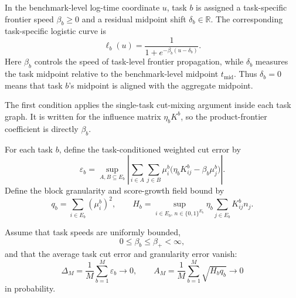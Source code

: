 \begin{definition}
\label{def:task-specific-logistic-frontier}
In the benchmark-level log-time coordinate \(u\), task \(b\) is assigned a task-specific frontier speed \(\beta_b\ge0\) and a residual midpoint shift \(\delta_b\in\mathbb R\). The corresponding task-specific logistic curve is
\begin{equation}
    \ell_b(u)=
    \frac{1}{1+e^{-\beta_b(u-\delta_b)}}.
    \label{eq:task-specific-logistic}
\end{equation}
Here \(\beta_b\) controls the speed of task-level frontier propagation, while \(\delta_b\) measures the task midpoint relative to the benchmark-level midpoint \(t_{\mathrm{mid}}\). Thus \(\delta_b=0\) means that task \(b\)'s midpoint is aligned with the aggregate midpoint.
\end{definition}

The first condition applies the single-task cut-mixing argument inside each task graph. It is written for the influence matrix $\eta_bK^b$, so the product-frontier coefficient is directly $\beta_b$.

\begin{definition}
\label{def:blockwise-error-granularity}
For each task $b$, define the task-conditioned weighted cut error by
\begin{equation}
    \varepsilon_b=
    \sup_{A,B\subseteq E_b}
    \left|
    \sum_{i\in A}\sum_{j\in B}
    \mu_i^b\bigl(\eta_bK_{ij}^b-\beta_b\mu_j^b\bigr)
    \right|.
    \label{eq:blockwise-epsilon-new}
\end{equation}
Define the block granularity and score-growth field bound by
\begin{equation*}
    q_b=\sum_{i\in E_b}(\mu_i^b)^2,
    \qquad
    H_b=\sup_{i\in E_b,\,n\in\{0,1\}^{E_b}}
    \eta_b\sum_{j\in E_b}K_{ij}^b n_j.
\end{equation*}
\end{definition}

\begin{condition}
\label{cond:blockwise-cut-mixing}
Assume that task speeds are uniformly bounded,
\begin{equation*}
    0\le\beta_b\le\beta_+<\infty,
\end{equation*}
and that the average task cut error and granularity error vanish:
\begin{equation}
    \Delta_M=\frac1M\sum_{b=1}^{M}\varepsilon_b\to0,
    \qquad
    A_M=\frac1M\sum_{b=1}^{M}\sqrt{H_b q_b}\to0
    \label{eq:blockwise-errors-new}
\end{equation}
in probability.
\end{condition}

